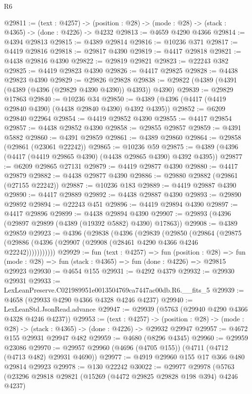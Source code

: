\begin{lexlean}{R6}
\begin{coremodule}
@29811 := (text : @4257) ->
  (position : @28) -> (mode : @28) -> (stack : @4365) -> (done : @4226) -> @4232
@29813 := @4659 @4290 @4366
@29814 := @4394 @29813
@29815 := @4389 @29814
@29816 := @10236 @371
@29817 := @4419 @29816
@29818 := @29817 @4390
@29819 := @4417 @29818
@29821 := @4438 @29816 @4390
@29822 := @29819 @29821
@29823 := @22243 @382
@29825 := @4419 @29823 @4390
@29826 := @4417 @29825
@29828 := @4438 @29823 @4390
@29829 := @29826 @29828
@29838 := @29822 (@4389 (@4391 (@4389 (@4396 (@29829 @4390 @4390)) @4393)) @4390)
@29839 := @29829 @17863
@29840 := @10236 @34
@29850 := @4389 (@4396 (@4417 (@4419 @29840 @4390) (@4438 @29840 @4390) @4392 @4395))
@29852 := @6209 @29840 @22964
@29854 := @4419 @29852 @4390
@29855 := @4417 @29854
@29857 := @4438 @29852 @4390
@29858 := @29855 @29857
@29859 := @4391 @5882
@29860 := @4391 @29859
@29861 := @4389 @29860
@29864 := @29858 (@29861 (@23061 @22242))
@29865 := @10236 @59
@29875 := @4389 (@4396 (@4417 (@4419 @29865 @4390) (@4438 @29865 @4390) @4392 @4395))
@29877 := @6209 @29865 @27131
@29879 := @4419 @29877 @4390
@29880 := @4417 @29879
@29882 := @4438 @29877 @4390
@29886 := @29880 @29882 (@29861 (@27155 @22242))
@29887 := @10236 @183
@29889 := @4419 @29887 @4390
@29890 := @4417 @29889
@29892 := @4438 @29887 @4390
@29893 := @29890 @29892
@29894 := @22243 @451
@29896 := @4419 @29894 @4390
@29897 := @4417 @29896
@29899 := @4438 @29894 @4390
@29907 := @29893 (@4396 (@29897 @29899 (@4389 (@19392 @5882) @4390) @17863))
@29908 := @4389 @29859
@29923 := @4396
    (@29838
      (@4396
        (@29839
          (@29850
            (@29864
              (@29875 (@29886 (@4396 (@29907 (@29908 (@28461 @4290 @4366 @4246 @22242)))))))))))
@29929 := fun (text : @4257) =>
  fun (position : @28) =>
  fun (mode : @28) => fun (stack : @4365) => fun (done : @4226) => @29815 @29923
@29930 := @4654 @155
@29931 := @4292 @4379
@29932 := @29930 @29931
@29933 := LexLeanPreserve.C021989951e0013504769ca7447ac00db.R6.__fits_5
@29939 := @4658 (@29933 @4290 @4366 @4328 @4246 @4237)
@29940 := LexLeanStd.JsonRead.advance
@29947 := @29939 (@5763 (@29940 @4290 @4366 @4328 @4246 @4237))
@29953 := (text : @4257) ->
  (position : @28) -> (mode : @28) -> (stack : @4365) -> (done : @4226) -> @29932 @29947
@29957 := @4672 @155 @29931 @29947 @482
@29959 := @4680 (@8296 @4345)
@29960 := @29959 @23086
@29970 := @29957 @29960 (@4696 (@4705 @155)) (@4711 (@4712 (@4713 @482) @29931 @4690))
@29977 := @4919 @29960 @155 @17 @366 @480 @29814 @29923
@29978 := @130 @22242
@30022 := @29977
    @29978
    (@5763
      (@23296
        @29818
        @29821
        (@15269 (@4472 @29825 @29828 @198 @394) @4246 @4237)

\end{coremodule}
\end{lexlean}
